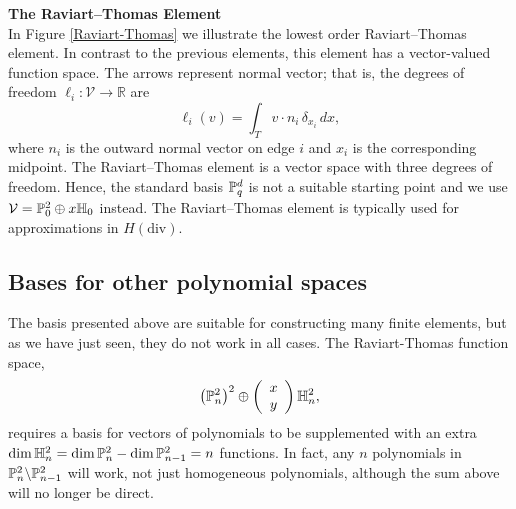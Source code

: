 \begin{example}{\bf{The Raviart--Thomas Element}} \\
In Figure \ref{Raviart-Thomas} we illustrate the lowest order Raviart--Thomas element.
In contrast to the previous elements, this element has a vector-valued
function space.  The arrows represent normal vector; that is, the 
degrees of freedom $\ell_i : \mathcal{V} \rightarrow \mathbb{R}$ are  
\begin{equation}
\ell_i ( v) = \int_{T} v \cdot n_i  \, \delta_{x_i} \, dx ,  
\end{equation}
where $n_i$ is the outward normal vector on edge $i$ and $x_i$ is the corresponding midpoint.
The Raviart--Thomas element is a vector space with three degrees of freedom. Hence, 
the standard basis $\P^d_q$ is not a suitable starting point and we use 
$\mathcal{V} = \P_0^2 \oplus x \H_0$ instead.   
The Raviart--Thomas element is typically used for approximations in $H(\mathrm{div})$.
\end{example}

%

\subsection{Bases for other polynomial spaces}
The basis presented above are suitable for constructing many finite
elements, but as we have just seen, they do not work in all cases.
The Raviart-Thomas function space,
\[
\left( \P^2_n \right)^2 \oplus
\left( \begin{array}{c} x \\ y \end{array} \right) \H^2_n,
\]
requires a basis for vectors of polynomials to be supplemented with
an extra \( \dim \H^2_n = \dim \P^2_n - \dim \P^2_{n-1} = n \) functions.  In fact,
any \( n \) polynomials in \( \P^2_n \backslash \P^2_{n-1} \) will
work, not just homogeneous polynomials, although the sum above will no
longer be direct.


